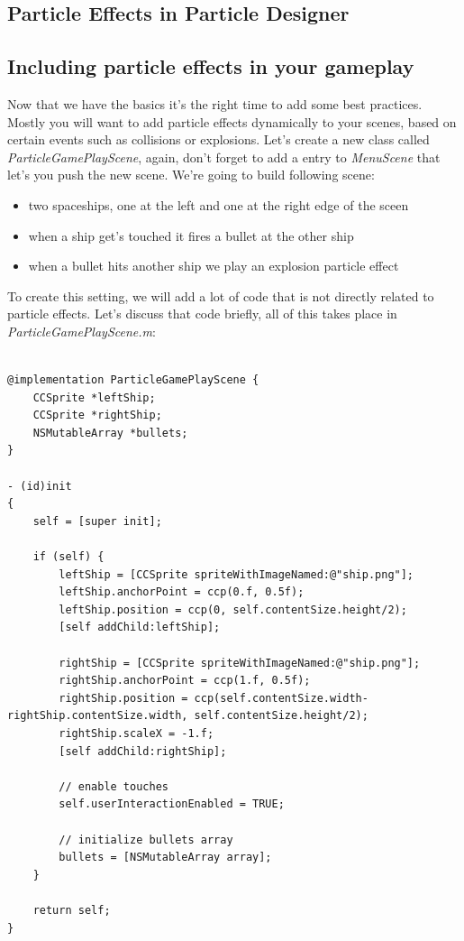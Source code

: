 \documentclass{scrreprt}
\begin{document}
\subsection{Particle Effects in Particle Designer}
\subsection{Including particle effects in your gameplay}
Now that we have the basics it's the right time to add some best practices.
Mostly you will want to add particle effects dynamically to your scenes, based
on certain events such as collisions or explosions. Let's create a new class
called \textit{ParticleGamePlayScene}, again, don't forget to add a entry to
\textit{MenuScene} that let's you push the new scene.
We're going to build following scene:
 \begin{itemize}
   \item two spaceships, one at the left and one at the right edge of the sceen
   \item when a ship get's touched it fires a bullet at the other ship
   \item when a bullet hits another ship we play an explosion particle
   effect
\end{itemize}
To create this setting, we will add a lot of code that is not directly related
to particle effects. Let's discuss that code briefly, all of this takes place
in \textit{ParticleGamePlayScene.m}:
\begin{lstlisting}[title=examples/ParticleGamePlayScene.m]

@implementation ParticleGamePlayScene {
    CCSprite *leftShip;
    CCSprite *rightShip;
    NSMutableArray *bullets;
}

- (id)init
{
    self = [super init];
    
    if (self) {
        leftShip = [CCSprite spriteWithImageNamed:@"ship.png"];
        leftShip.anchorPoint = ccp(0.f, 0.5f);
        leftShip.position = ccp(0, self.contentSize.height/2);
        [self addChild:leftShip];
        
        rightShip = [CCSprite spriteWithImageNamed:@"ship.png"];
        rightShip.anchorPoint = ccp(1.f, 0.5f);
        rightShip.position = ccp(self.contentSize.width-rightShip.contentSize.width, self.contentSize.height/2);
        rightShip.scaleX = -1.f;
        [self addChild:rightShip];
        
        // enable touches
        self.userInteractionEnabled = TRUE;
        
        // initialize bullets array
        bullets = [NSMutableArray array];
    }
    
    return self;
}
\end{lstlisting}
\end{document}

